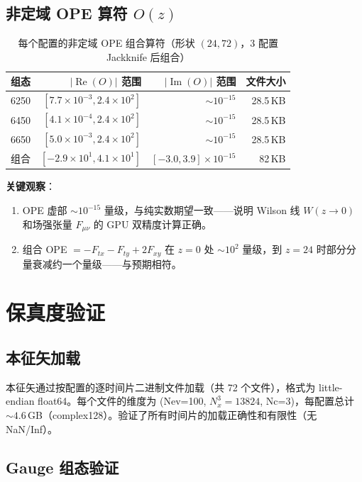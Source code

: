 \documentclass[12pt,a4paper]{ctexart}
\begin{document}
\subsection{非定域 OPE 算符 $O(z)$}

\begin{table}[H]
\centering
\caption{每个配置的非定域 OPE 组合算符（形状 $(24,72)$，3 配置 Jackknife 后组合）}
\begin{tabular}{lrrr}
\toprule
组态 & $|\operatorname{Re}(O)|$ 范围 & $|\operatorname{Im}(O)|$ 范围 & 文件大小 \\
\midrule
6250 & $[7.7\times 10^{-3}, 2.4\times 10^{2}]$ & $\sim 10^{-15}$ & 28.5\,KB \\
6450 & $[4.1\times 10^{-4}, 2.4\times 10^{2}]$ & $\sim 10^{-15}$ & 28.5\,KB \\
6650 & $[5.0\times 10^{-3}, 2.4\times 10^{2}]$ & $\sim 10^{-15}$ & 28.5\,KB \\
\midrule
组合 & $[-2.9\times 10^{1}, 4.1\times 10^{1}]$ & $[-3.0, 3.9]\times 10^{-15}$ & 82\,KB \\
\bottomrule
\end{tabular}
\end{table}

\textbf{关键观察}：
\begin{enumerate}[itemsep=3pt]
  \item OPE 虚部 $\sim 10^{-15}$ 量级，与纯实数期望一致——说明 Wilson 线 $W(z\to 0)$ 和场强张量 $F_{\mu\nu}$ 的 GPU 双精度计算正确。
  \item 组合 OPE $= -F_{tx} - F_{ty} + 2F_{xy}$ 在 $z=0$ 处 $\sim 10^2$ 量级，到 $z=24$ 时部分分量衰减约一个量级——与预期相符。
\end{enumerate}

\section{保真度验证}

\subsection{本征矢加载}

本征矢通过按配置的逐时间片二进制文件加载（共 72 个文件），格式为 little-endian float64。每个文件的维度为 (Nev=100, $N_x^3=13824$, Nc=3)，每配置总计 $\sim 4.6$\,GB（complex128）。验证了所有时间片的加载正确性和有限性（无 NaN/Inf）。

\subsection{Gauge 组态验证}
\end{document}
